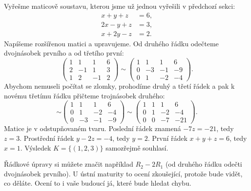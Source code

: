 \begin{example}\label{ex:gauss-matice}
  Vyřešme maticově soustavu, kterou jsme už jednou vyřešili v předchozí sekci:
  \begin{align*}
    x + y + z &= 6,\\
    2x - y + z &= 3,\\
    x + 2y - z &= 2.
  \end{align*}
  Napíšeme rozšířenou matici a upravujeme. Od druhého řádku odečteme dvojnásobek prvního a od třetího první:
  \begin{equation*}
    \left(\begin{array}{rrr|r}
      1 & 1 & 1 & 6\\
      2 & -1 & 1 & 3\\
      1 & 2 & -1 & 2
    \end{array}\right)
    \sim
    \left(\begin{array}{rrr|r}
      1 & 1 & 1 & 6\\
      0 & -3 & -1 & -9\\
      0 & 1 & -2 & -4
    \end{array}\right).
  \end{equation*}
  Abychom nemuseli počítat se zlomky, prohodíme druhý a třetí řádek a pak k novému třetímu řádku přičteme trojnásobek druhého:
  \begin{equation*}
    \sim
    \left(\begin{array}{rrr|r}
      1 & 1 & 1 & 6\\
      0 & 1 & -2 & -4\\
      0 & -3 & -1 & -9
    \end{array}\right)
    \sim
    \left(\begin{array}{rrr|r}
      1 & 1 & 1 & 6\\
      0 & 1 & -2 & -4\\
      0 & 0 & -7 & -21
    \end{array}\right).
  \end{equation*}
  Matice je v odstupňovaném tvaru. Poslední řádek znamená $-7z = -21$, tedy $z = 3$. Prostřední řádek $y - 2z = -4$, tedy $y = 2$. První řádek $x + y + z = 6$, tedy $x = 1$. Výsledek $K = \{(1, 2, 3)\}$ samozřejmě souhlasí.
\end{example}

\begin{note}
  Řádkové úpravy si můžete značit například $R_2 - 2R_1$ (od druhého řádku odečti dvojnásobek prvního). U ústní maturity to ocení zkoušející, protože bude vidět, co děláte. Ocení to i vaše budoucí já, které bude hledat chybu.
\end{note}

